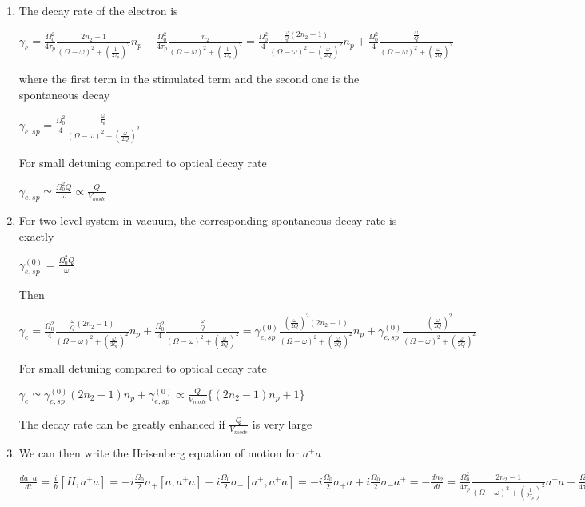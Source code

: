 \documentclass{article}
\begin{document}
\begin{enumerate}
  \item The decay rate of the electron is

$\gamma_e = \frac{\Omega_0^2}{4 \tau_p}\frac{2n_2-1}{(\Omega-\omega)^2+(\frac{1}{2\tau_p})^2} n_p +\frac{\Omega_0^2}{4 \tau_p}\frac{n_2}{(\Omega-\omega)^2+(\frac{1}{2\tau_p})^2}= \frac{\Omega_0^2}{4 }\frac{\frac{\omega}{Q} (2n_2-1)}{(\Omega-\omega)^2+(\frac{\omega}{2Q})^2} n_p + \frac{\Omega_0^2}{4 }\frac{\frac{\omega}{Q}}{(\Omega-\omega)^2+(\frac{\omega}{2Q})^2} $

where the first term in the stimulated term and the second one is the
spontaneous decay

$\gamma_{e, sp} =  \frac{\Omega_0^2}{4 }\frac{\frac{\omega}{Q}}{(\Omega-\omega)^2+(\frac{\omega}{2Q})^2}$

For small detuning compared to optical decay rate

$\gamma_{e, sp} \simeq   \frac{\Omega_0^2Q}{\omega} \propto \frac{Q}{V_{mode}}$

   \item For two-level system in vacuum, the corresponding spontaneous decay
rate is exactly

$\gamma_{e, sp}^{(0)} =   \frac{\Omega_0^2Q}{\omega} $

Then

$\gamma_e = \frac{\Omega_0^2}{4 }\frac{\frac{\omega}{Q} (2n_2-1)}{(\Omega-\omega)^2+(\frac{\omega}{2Q})^2} n_p + \frac{\Omega_0^2}{4 }\frac{\frac{\omega}{Q}}{(\Omega-\omega)^2+(\frac{\omega}{2Q})^2}= \gamma_{e, sp}^{(0)}\frac{(\frac{\omega}{2Q})^2 (2n_2-1)}{(\Omega-\omega)^2+(\frac{\omega}{2Q})^2} n_p + \gamma_{e, sp}^{(0)}\frac{(\frac{\omega}{2Q})^2}{(\Omega-\omega)^2+(\frac{\omega}{2Q})^2} $

For small detuning compared to optical decay rate

$\gamma_e \simeq \gamma_{e, sp}^{(0)}(2n_2-1) n_p + \gamma_{e, sp}^{(0)} \propto \frac{Q}{V_{mode}} \{ (2n_2-1) n_p+1 \}$

The decay rate can be greatly enhanced if $\frac{Q}{V_{mode}}$ is very
large

    \item We can then write the Heisenberg equation of motion for $a^+a$

$\frac{d a^+a}{dt} = \frac{i}{\hbar} [H, a^+a] =-i \frac{\Omega_0}{2} \sigma_+ [a ,a^+a]-i \frac{\Omega_0}{2}\sigma_-[ a^+ ,a^+a] = -i \frac{\Omega_0}{2}\sigma_+ a + i \frac{\Omega_0}{2}\sigma_- a^+ = -\frac{d n_2}{dt}=  \frac{\Omega_0^2}{4 \tau_p}\frac{2n_2-1}{(\Omega-\omega)^2  +(\frac{1}{2\tau_p})^2} a^+a+\frac{\Omega_0^2}{4 \tau_p}\frac{ n_2}{(\Omega-\omega)^2+(\frac{1}{2\tau_p})^2}$


\end{enumerate}
\end{document}

